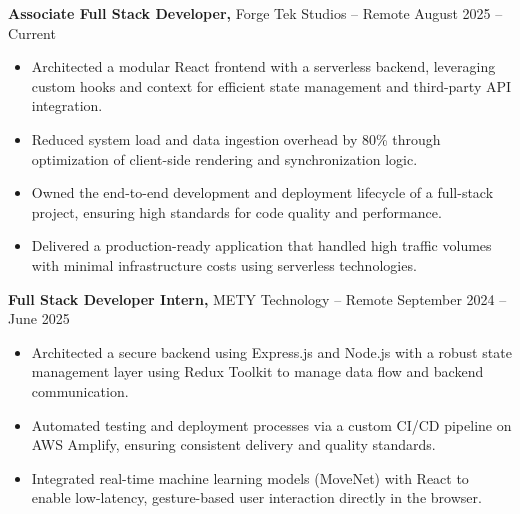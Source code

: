 \documentclass[11pt]{article}       %
\begin{document}
\textbf{Associate Full Stack Developer,} {Forge Tek Studios} -- Remote \hfill August 2025 -- Current 
\vspace{-9pt}
\begin{itemize}
  \item Architected a modular React frontend with a serverless backend, leveraging custom hooks and context for efficient state management and third-party API integration.
  \item Reduced system load and data ingestion overhead by 80\% through optimization of client-side rendering and synchronization logic.
  \item Owned the end-to-end development and deployment lifecycle of a full-stack project, ensuring high standards for code quality and performance.
  \item Delivered a production-ready application that handled high traffic volumes with minimal infrastructure costs using serverless technologies.
\end{itemize}

\textbf{Full Stack Developer Intern,} {METY Technology} -- Remote \hfill September 2024 -- June 2025 
\vspace{-9pt}
\begin{itemize}
  \item Architected a secure backend using Express.js and Node.js with a robust state management layer using Redux Toolkit to manage data flow and backend communication.
  \item Automated testing and deployment processes via a custom CI/CD pipeline on AWS Amplify, ensuring consistent delivery and quality standards.
  \item Integrated real-time machine learning models (MoveNet) with React to enable low-latency, gesture-based user interaction directly in the browser.
\end{itemize}

\end{document}
